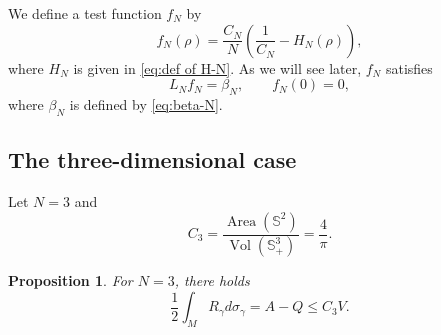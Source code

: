 \documentclass[11pt,letterpaper]{amsart}
\newtheorem{proposition}[theorem]{Proposition}
\theoremstyle{definition}
\theoremstyle{remark}
\numberwithin{equation}{section}
\newcommand{\Sph}{\mathbb S}
\newcommand{\vol}{\operatorname{Vol}}
\newcommand{\area}{\operatorname{Area}}
\begin{document}
We define a test function $f_N$ by
\begin{equation}\label{eq: def of test function f-N}
    f_N(\rho)=\frac{C_N}{N}\left(\frac{1}{C_N}-H_N(\rho)\right),
\end{equation}
where $H_N$ is given in \eqref{eq:def of H-N}. As we will see later, $f_N$ satisfies
\begin{equation}\label{eq:property of f-N}
    L_Nf_N=\beta_N, \qquad f_N(0)=0,
\end{equation}
where $\beta_N$ is defined by \eqref{eq:beta-N}.
\subsection{The three-dimensional case}
Let $N=3$ and
\[
 C_3=\frac{\area(\Sph^2)}{\vol(\Sph^3_+)}=\frac4\pi.
\]
\begin{proposition}\label{lem:N3-compensated}
For $N=3$, there holds
\begin{equation}\label{eq:N3-compensated}
 \frac{1}{2} \int_M R_\gamma d \sigma_\gamma=A-Q\leq C_3 V.
\end{equation}
\end{proposition}
\end{document}
